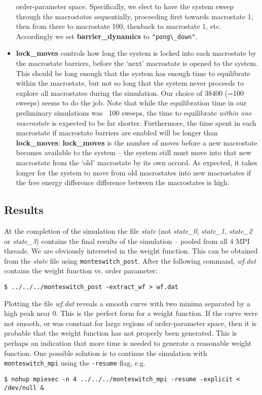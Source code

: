 \documentclass{report}
\begin{document}
\begin{itemize}
  order-parameter space.
  Specifically, we elect to have the system sweep through the macrostates sequentially, proceeding first towards macrostate 1, then from there to
  macrostate 100, thenback to macrostate 1, etc. Accordingly we set \textbf{barrier\_dynamics} to \verb|"pong\_down"|.
\item \textbf{lock\_moves} controls how long the system is locked into each macrostate by the macrostate barriers, before the `next' macrostate is 
  opened to the
  system. This should be long enough that the system has enough time to equilibrate within the macrostate, but not so long that the system never proceeds
  to explore all macrostates during the simulation. Our choice of 38400 (=100 sweeps) seems to do the job. Note that while the equilibration time in our 
  preliminary simulations was ~100 sweeps, the time to equilibrate \emph{within one macrostate} is expected to be far shorter. Furthermore, the time spent in
  each macrostate if macrostate barriers are enabled will be longer than \textbf{lock\_moves}: \textbf{lock\_moves} is the number of moves before a 
  new macrostate becomes
  available to the system -- the system still must move into that new macrostate from the `old' macrostate by its own accord. As expected, it takes
  longer for the system to move from old macrostates into new macrostates if the free energy difference difference between the macrostates is high.
\end{itemize}

\subsection{Results}
At the completion of the simulation the file \emph{state} (not \emph{state\_0}, \emph{state\_1}, \emph{state\_2} or \emph{state\_3}) 
contains the final results of the simulation --
pooled from all 4 MPI threads. We are obviously interested in the weight function. This can be obtained from the \emph{state} file using 
\texttt{monteswitch\_post}.
After the following command, \emph{wf.dat} contains the weight function vs. order parameter:
\begin{verbatim}
$ ../../../monteswitch_post -extract_wf > wf.dat
\end{verbatim}
Plotting the file \emph{wf.dat} reveals a smooth curve with two minima separated by a high peak near 0. This is the perfect form for a weight function. If the
curve were not smooth, or was constant for large regions of order-parameter space, then it is probable that the weight function has not properly been
generated. This is perhaps an indication that more time is needed to generate a reasonable weight function. One possible solution is to continue
the simulation with \texttt{monteswitch\_mpi} using the \texttt{-resume} flag, e.g.
\begin{verbatim}
$ nohup mpiexec -n 4 ../../../monteswitch_mpi -resume -explicit <
/dev/null &
\end{verbatim}
\end{document}
